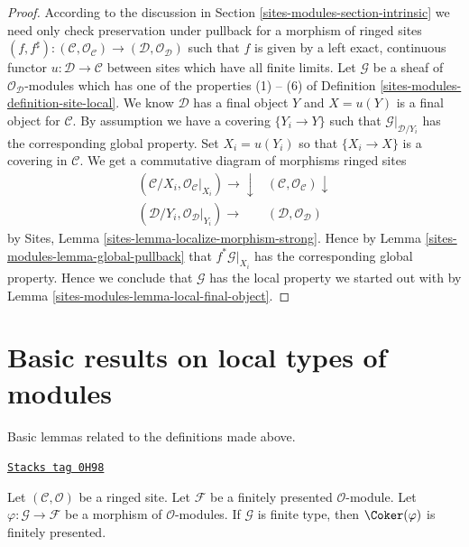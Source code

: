 \begin{proof}
According to the discussion in Section \ref{sites-modules-section-intrinsic}
we need only check preservation under pullback for a morphism of ringed sites
$(f, f^\sharp) :
(\mathcal{C}, \mathcal{O}_\mathcal{C})
\to
(\mathcal{D}, \mathcal{O}_\mathcal{D})$
such that $f$ is given by a left exact, continuous functor
$u : \mathcal{D} \to \mathcal{C}$ between sites which have
all finite limits.
Let $\mathcal{G}$ be a sheaf of $\mathcal{O}_\mathcal{D}$-modules
which has one of the properties (1) -- (6) of
Definition \ref{sites-modules-definition-site-local}.
We know $\mathcal{D}$ has a final object $Y$ and $X = u(Y)$
is a final object for $\mathcal{C}$. By assumption we have
a covering $\{Y_i \to Y\}$ such that $\mathcal{G}|_{\mathcal{D}/Y_i}$
has the corresponding global property. Set $X_i = u(Y_i)$ so
that $\{X_i \to X\}$ is a covering in $\mathcal{C}$.
We get a commutative diagram of morphisms ringed sites
$$
\begin{array}{cc}(\mathcal{C}/X_i, \mathcal{O}_\mathcal{C}|_{X_i}) \longrightarrow\downarrow & (\mathcal{C}, \mathcal{O}_\mathcal{C}) \downarrow \\ (\mathcal{D}/Y_i, \mathcal{O}_\mathcal{D}|_{Y_i}) \longrightarrow & (\mathcal{D}, \mathcal{O}_\mathcal{D})\end{array}
$$
by Sites, Lemma \ref{sites-lemma-localize-morphism-strong}.
Hence by Lemma \ref{sites-modules-lemma-global-pullback}
that $f^*\mathcal{G}|_{X_i}$ has the corresponding global
property. Hence we conclude that $\mathcal{G}$ has the local
property we started out with by Lemma \ref{sites-modules-lemma-local-final-object}.
\end{proof}

\section{Basic results on local types of modules}
\label{sites-modules-section-basics}
Basic lemmas related to the definitions made above.

\begin{lemma}
\label{sites-modules-lemma-cokernel-finite-finite-presentation}
\href{https://stacks.math.columbia.edu/tag/0H98}{\texttt{Stacks tag 0H98}}

Let $(\mathcal{C},\mathcal{O})$ be a ringed site. Let $\mathcal{F}$ be a
finitely presented $\mathcal{O}$-module. Let
$\varphi : \mathcal{G} \to \mathcal{F}$ be a morphism of
$\mathcal{O}$-modules. If $\mathcal{G}$ is finite type, then
$\Coker(\varphi)$ is finitely presented.
\end{lemma}

